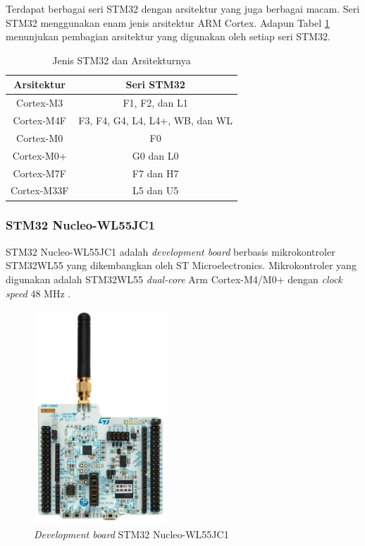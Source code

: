 Terdapat berbagai seri STM32 dengan arsitektur yang juga berbagai macam. Seri STM32 menggunakan enam jenis arsitektur ARM Cortex. Adapun Tabel \ref{Tab: stm-arch-table} menunjukan pembagian arsitektur yang digunakan oleh setiap seri STM32.

\begin{table}[H]
	\caption{Jenis STM32 dan Arsitekturnya}
	\vspace{0.5em}
	\centering
	\begin{tabular}{cc}
		\hline
		\textbf{Arsitektur} & \textbf{Seri STM32} \\
		\hline 
		Cortex-M3 & F1, F2, dan L1\\
		Cortex-M4F & F3, F4, G4, L4, L4+, WB, dan WL\\
		Cortex-M0 & F0\\ 
		Cortex-M0+ & G0 dan L0\\
		Cortex-M7F & F7 dan H7\\ 
		Cortex-M33F & L5 dan U5\\ \hline
	\end{tabular}
	\label{Tab: stm-arch-table}
\end{table}

\subsubsection{STM32 Nucleo-WL55JC1}
STM32 Nucleo-WL55JC1 adalah \textit{development board} berbasis mikrokontroler STM32WL55 yang  dikembangkan oleh ST Microelectronics. Mikrokontroler yang digunakan adalah STM32WL55  \textit{dual-core }Arm Cortex-M4/M0+ dengan \textit{clock speed} 48 MHz \cite{STMicroelectronics2022a}.

\begin{figure}[ht]
	\centering
	\includegraphics[width=5cm]{contents/chapter-2/stm32-wl55jc1.jpg}
	\caption{\textit{Development board} STM32 Nucleo-WL55JC1}
	\label{Fig: STM32 Nucleo-WL55JC1}
\end{figure}

